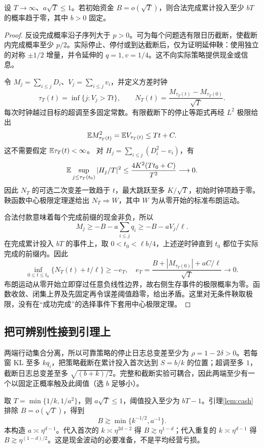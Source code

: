 \begin{lemma}[完成累计投入需要现金]\label{lem:cash}
设 $T\to\infty$、$a\sqrt T\leq1$。若初始资金 $B=o(\sqrt T)$，则合法完成累计投入至少 $bT$ 的概率趋于零，其中 $b>0$ 固定。
\end{lemma}
\begin{proof}
反设完成概率沿子序列大于 $p>0$。可为每个问题选有限日历截断，使截断内完成概率至少 $p/2$。实际停止、停付或到达截断后，仅为证明延伸鞅：使用独立的对称 $\pm1/2$ 增量，并令延伸的 $q=1,v=1/4$。这不向实际策略提供现金或信息。

令 $M_j=\sum_{i\leq j}D_i$、$V_j=\sum_{i\leq j}v_i$，并定义方差时钟
\[
 \tau_T(t)=\inf\{j:V_j>Tt\},\qquad
 N_T(t)=\frac{M_{\tau_T(t)}-M_{\tau_T(0)}}{\sqrt T}.
\]
每次时钟越过目标的超调至多固定常数。有限截断下的停止等距式再经 $L^2$ 极限给出
\[
 \mathbb E M_{\tau_T(t)}^2=\mathbb E V_{\tau_T(t)}\leq Tt+C.
\]
这不需要假定 $\mathbb E\tau_T(t)<\infty$。
对 $H_j=\sum_{i\leq j}(D_i^2-v_i)$，有
\[
 \mathbb E\sup_{j\leq\tau_T(t_0)}|H_j/T|^2
 \leq \frac{4K^2(Tt_0+C)}{T^2}\longrightarrow0.
\]
因此 $N_T$ 的可选二次变差一致趋于 $t$，最大跳跃至多 $K/\sqrt T$，初始时钟项趋于零。鞅函数中心极限定理\cite[Theorem 2.1(i)]{whitt}遂给出 $N_T\Rightarrow W$，其中 $W$ 为从零开始的标准布朗运动。

合法付款意味着每个完成前缀的现金非负，所以
\[
 M_j\geq-B-a\sum_{i\leq j}q_i\geq-B-aV_j/\ell.
\]
在完成累计投入 $bT$ 的事件上，取 $0<t_0<\ell b/4$，上述逆时钟直到 $t_0$ 都位于实际完成的前缀内。因此
\[
 \inf_{0\leq t\leq t_0}\{N_T(t)+t/\ell\}\geq-e_T,
 \quad
 e_T=\frac{B+|M_{\tau_T(0)}|+aC/\ell}{\sqrt T}\longrightarrow0.
\]
布朗运动从零开始立即穿过任意负线性边界，故右侧生存事件的极限概率为零。函数收敛、闭集上界及先固定再令误差阈值趋零，给出矛盾。这里对无条件鞅取极限，没有在“成功完成”的选择事件下套用中心极限定理。
\end{proof}

\subsection{把可辨别性接到引理上}
两端行动集合分离，所以可靠策略的停止日志总变差至少为 $\rho=1-2\delta>0$。若每窗 KL 至多 $kq_i$，把策略截断在累计投入首次达到 $S=b/k$ 的位置；超调至多 $1$，截断日志总变差至多 $\sqrt{(b+k)/2}$。完整和截断实验可耦合，因此两端至少有一个以固定正概率触及此阈值（选 $b$ 足够小）。

取 $T=\min\{1/k,1/a^2\}$，则 $a\sqrt T\leq1$，阈值投入至少为 $bT-1$。引理\ref{lem:cash}排除 $B=o(\sqrt T)$，得到
\begin{equation}\label{eq:cashinfo}
 B\gtrsim\min\{k^{-1/2},a^{-1}\}.
\end{equation}
本构造 $a\asymp\eta^{d-1}$。代入首次的 $k\asymp\eta^{2d-2}$ 得 $B\gtrsim\eta^{1-d}$；代入重复的 $k\asymp\eta^{d-1}$ 得 $B\gtrsim\eta^{(1-d)/2}$。这是现金波动的必要准备，不是平均经营亏损。

